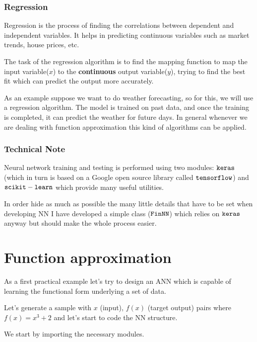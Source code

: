 \subsubsection{Regression}\label{regression}

Regression is the process of finding the correlations between dependent
and independent variables. It helps in predicting continuous
variables such as market trends, house prices, etc.

The task of the regression algorithm is to find the mapping function to
map the input variable(\(x\)) to the \textbf{continuous} output
variable(\(y\)), trying to find the best fit which can predict the
output more accurately.

As an example suppose we want to do weather forecasting, so for this, we will
use a regression algorithm. The model is trained
on past data, and once the training is completed, it can predict the
weather for future days. In general whenever we are dealing with
function approximation this kind of algorithms can be applied.

\subsubsection{Technical Note}\label{technical-note}

Neural network training and testing is performed using two modules:
\(\tt{keras}\) (which in turn is based on a Google open source library
called \(\tt{tensorflow}\)) and \(\tt{scikit-learn}\) which provide many
useful utilities.

In order hide as much as possible the many little details that have to
be set when developing NN I have developed a simple class
(\(\tt{FinNN}\)) which relies on \(\tt{keras}\) anyway but should make
the whole process easier.

\section{Function approximation}\label{function-approximation}

As a first practical example let's try to design an ANN which is capable
of learning the functional form underlying a set of data.

Let's generate a sample with \(x\) (input), \(f(x)\) (target output)
pairs where \(f(x) = x^3 +2\) and let's start to code the NN structure.

We start by importing the necessary modules.

